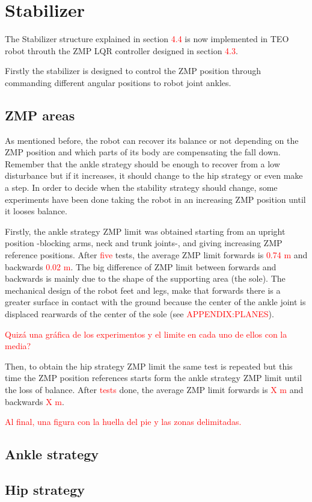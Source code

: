 \section{Stabilizer}
The Stabilizer structure explained in section \textcolor{red}{4.4} is now implemented in TEO robot throuth the ZMP LQR controller designed in section \textcolor{red}{4.3}. 

Firstly the stabilizer is designed to control the ZMP position through commanding different angular positions to robot joint ankles.

\subsection{ZMP areas}
As mentioned before, the robot can recover its balance or not depending on the ZMP position and which parts of its body are compensating the fall down. Remember that the ankle strategy should be enough to recover from a low disturbance but if it increases, it should change to the hip strategy or even make a step. In order to decide when the stability strategy should change, some experiments have been done taking the robot in an increasing ZMP position until it looses balance. 

Firstly, the ankle strategy ZMP limit was obtained starting from an upright position -blocking arms, neck and trunk joints-, and giving increasing ZMP reference positions. After \textcolor{red}{five} tests, the average ZMP limit forwards is \textcolor{red}{0.74 m} and backwards \textcolor{red}{0.02 m}. The big difference of ZMP limit between forwards and backwards is mainly due to the shape of the supporting area (the sole). The mechanical design of the robot feet and legs, make that forwards there is a greater surface in contact with the ground because the center of the ankle joint is displaced rearwards of the center of the sole (see \textcolor{red}{APPENDIX:PLANES}).

\textcolor{red}{Quizá una gráfica de los experimentos y el limite en cada uno de ellos con la media?}

Then, to obtain the hip strategy ZMP limit the same test is repeated but this time the ZMP position references starts form the ankle strategy ZMP limit until the loss of balance. After \textcolor{red}{tests} done, the average ZMP limit forwards is \textcolor{red}{X m} and backwards \textcolor{red}{X m}.


\textcolor{red}{Al final, una figura con la huella del pie y las zonas delimitadas.}

\subsection{Ankle strategy}


\subsection{Hip strategy}
